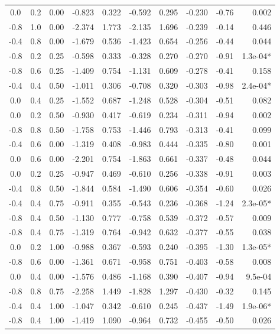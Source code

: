 \begin{longtable}{ccc|rr|rr|r|r|r}
  0.0 & 0.2 & 0.00 & -0.823 & 0.322 & -0.592 & 0.295 & -0.230 & -0.76 & 0.002 \\
  -0.8 & 1.0 & 0.00 & -2.374 & 1.773 & -2.135 & 1.696 & -0.239 & -0.14 & 0.446 \\
  -0.4 & 0.8 & 0.00 & -1.679 & 0.536 & -1.423 & 0.654 & -0.256 & -0.44 & 0.044 \\
  -0.8 & 0.2 & 0.25 & -0.598 & 0.333 & -0.328 & 0.270 & -0.270 & -0.91 & 1.3e-04* \\
  -0.8 & 0.6 & 0.25 & -1.409 & 0.754 & -1.131 & 0.609 & -0.278 & -0.41 & 0.158 \\
  -0.4 & 0.4 & 0.50 & -1.011 & 0.306 & -0.708 & 0.320 & -0.303 & -0.98 & 2.4e-04* \\
  0.0 & 0.4 & 0.25 & -1.552 & 0.687 & -1.248 & 0.528 & -0.304 & -0.51 & 0.082 \\
  0.0 & 0.2 & 0.50 & -0.930 & 0.417 & -0.619 & 0.234 & -0.311 & -0.94 & 0.002 \\
  -0.8 & 0.8 & 0.50 & -1.758 & 0.753 & -1.446 & 0.793 & -0.313 & -0.41 & 0.099 \\
  -0.4 & 0.6 & 0.00 & -1.319 & 0.408 & -0.983 & 0.444 & -0.335 & -0.80 & 0.001 \\
  0.0 & 0.6 & 0.00 & -2.201 & 0.754 & -1.863 & 0.661 & -0.337 & -0.48 & 0.044 \\
  0.0 & 0.2 & 0.25 & -0.947 & 0.469 & -0.610 & 0.256 & -0.338 & -0.91 & 0.003 \\
  -0.4 & 0.8 & 0.50 & -1.844 & 0.584 & -1.490 & 0.606 & -0.354 & -0.60 & 0.026 \\
  -0.4 & 0.4 & 0.75 & -0.911 & 0.355 & -0.543 & 0.236 & -0.368 & -1.24 & 2.3e-05* \\
  -0.8 & 0.4 & 0.50 & -1.130 & 0.777 & -0.758 & 0.539 & -0.372 & -0.57 & 0.009 \\
  -0.8 & 0.4 & 0.75 & -1.319 & 0.764 & -0.942 & 0.632 & -0.377 & -0.55 & 0.038 \\
  0.0 & 0.2 & 1.00 & -0.988 & 0.367 & -0.593 & 0.240 & -0.395 & -1.30 & 1.3e-05* \\
  -0.8 & 0.6 & 0.00 & -1.361 & 0.671 & -0.958 & 0.751 & -0.403 & -0.58 & 0.008 \\
  0.0 & 0.4 & 0.00 & -1.576 & 0.486 & -1.168 & 0.390 & -0.407 & -0.94 & 9.5e-04 \\
  -0.8 & 0.8 & 0.75 & -2.258 & 1.449 & -1.828 & 1.297 & -0.430 & -0.32 & 0.145 \\
  -0.4 & 0.4 & 1.00 & -1.047 & 0.342 & -0.610 & 0.245 & -0.437 & -1.49 & 1.9e-06* \\
  -0.8 & 0.4 & 1.00 & -1.419 & 1.090 & -0.964 & 0.732 & -0.455 & -0.50 & 0.026 \\

\end{longtable}
